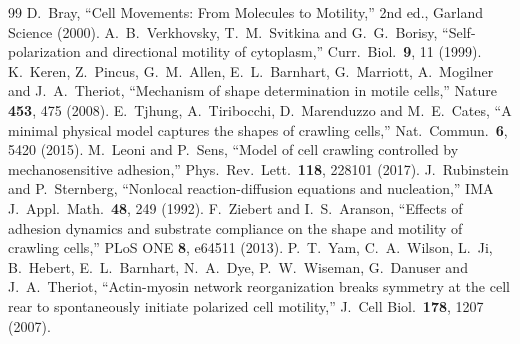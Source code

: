 \documentclass[11pt]{article}
\begin{document}
\begin{thebibliography}{99}
\setlength{\itemsep}{1pt}
\setlength{\parsep}{0pt}
  D.~Bray,
  ``Cell Movements: From Molecules to Motility,''
  2nd ed., Garland Science (2000).
  A.~B.~Verkhovsky, T.~M.~Svitkina and G.~G.~Borisy,
  ``Self-polarization and directional motility of cytoplasm,''
  Curr.\ Biol.\ {\bf 9}, 11 (1999).
  K.~Keren, Z.~Pincus, G.~M.~Allen, E.~L.~Barnhart, G.~Marriott, A.~Mogilner and J.~A.~Theriot,
  ``Mechanism of shape determination in motile cells,''
  Nature {\bf 453}, 475 (2008).
  E.~Tjhung, A.~Tiribocchi, D.~Marenduzzo and M.~E.~Cates,
  ``A minimal physical model captures the shapes of crawling cells,''
  Nat.\ Commun.\ {\bf 6}, 5420 (2015).
  M.~Leoni and P.~Sens,
  ``Model of cell crawling controlled by mechanosensitive adhesion,''
  Phys.\ Rev.\ Lett.\ {\bf 118}, 228101 (2017).
  J.~Rubinstein and P.~Sternberg,
  ``Nonlocal reaction-diffusion equations and nucleation,''
  IMA J.\ Appl.\ Math.\ {\bf 48}, 249 (1992).
  F.~Ziebert and I.~S.~Aranson,
  ``Effects of adhesion dynamics and substrate compliance on the shape and motility of crawling cells,''
  PLoS ONE {\bf 8}, e64511 (2013).
  P.~T.~Yam, C.~A.~Wilson, L.~Ji, B.~Hebert, E.~L.~Barnhart, N.~A.~Dye, P.~W.~Wiseman, G.~Danuser and J.~A.~Theriot,
  ``Actin-myosin network reorganization breaks symmetry at the cell rear to spontaneously initiate polarized cell motility,''
  J.\ Cell Biol.\ {\bf 178}, 1207 (2007).
\end{thebibliography}
\end{document}
